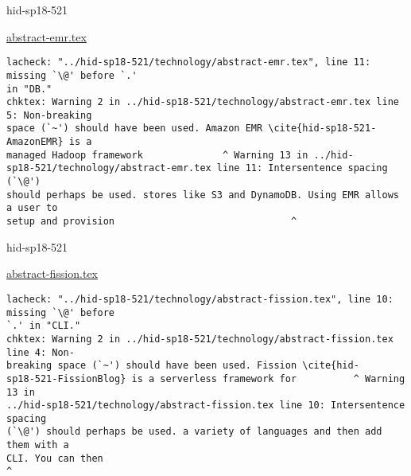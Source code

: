 

\begin{IU}

hid-sp18-521

\href{https://github.com/cloudmesh-community/hid-sp18-521/blob/master//technology/abstract-emr.tex}{abstract-emr.tex}

\begin{tiny}
\begin{verbatim}
lacheck: "../hid-sp18-521/technology/abstract-emr.tex", line 11: missing `\@' before `.'
in "DB."
chktex: Warning 2 in ../hid-sp18-521/technology/abstract-emr.tex line 5: Non-breaking
space (`~') should have been used. Amazon EMR \cite{hid-sp18-521-AmazonEMR} is a
managed Hadoop framework              ^ Warning 13 in ../hid-
sp18-521/technology/abstract-emr.tex line 11: Intersentence spacing (`\@')
should perhaps be used. stores like S3 and DynamoDB. Using EMR allows a user to
setup and provision                               ^
\end{verbatim}
\end{tiny}
\end{IU}



\begin{IU}

hid-sp18-521

\href{https://github.com/cloudmesh-community/hid-sp18-521/blob/master//technology/abstract-fission.tex}{abstract-fission.tex}

\begin{tiny}
\begin{verbatim}
lacheck: "../hid-sp18-521/technology/abstract-fission.tex", line 10: missing `\@' before
`.' in "CLI."
chktex: Warning 2 in ../hid-sp18-521/technology/abstract-fission.tex line 4: Non-
breaking space (`~') should have been used. Fission \cite{hid-
sp18-521-FissionBlog} is a serverless framework for          ^ Warning 13 in
../hid-sp18-521/technology/abstract-fission.tex line 10: Intersentence spacing
(`\@') should perhaps be used. a variety of languages and then add them with a
CLI. You can then                                                       ^
\end{verbatim}
\end{tiny}
\end{IU}



